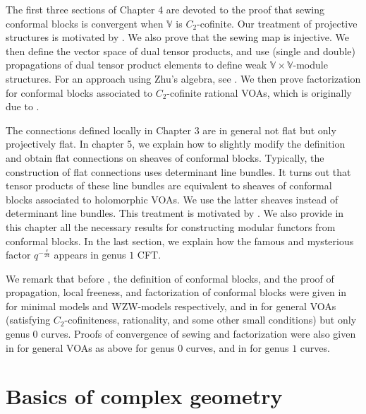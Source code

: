 \documentclass[12pt,a4paper,notitlepage]{report}
\theoremstyle{definition}
\theoremstyle{plain}
\newcommand{\Vbb}{\mathbb V}
\numberwithin{equation}{section}
\begin{document}
The first three sections of Chapter 4 are devoted to the proof that sewing conformal blocks is convergent when $\Vbb$ is $C_2$-cofinite. Our treatment of projective structures is motivated by \cite[Sec. 8.2]{FB04}. We also prove that the sewing map is injective. We then define the vector space of dual tensor products, and use (single and double) propagations of dual tensor product elements to define weak $\Vbb\times\Vbb$-module structures.  For an approach using Zhu's algebra, see \cite{DGT19b}. We then prove factorization for conformal blocks associated to $C_2$-cofinite rational VOAs, which is originally due to \cite{DGT19b}.

The connections defined locally in Chapter 3 are in general not flat but only projectively flat. In chapter 5, we explain how to slightly modify the definition and obtain flat connections on sheaves of conformal blocks. Typically, the construction of flat connections uses determinant line bundles. It turns out that tensor products of these line bundles are equivalent to sheaves of conformal blocks associated to holomorphic VOAs. We use the latter sheaves instead of determinant line bundles. This treatment is motivated by \cite{AU07a,AU07b}. We also provide in this chapter all the necessary results for constructing modular functors from conformal blocks. In the last section, we explain how the famous and mysterious factor $q^{-\frac c{24}}$ appears in genus $1$ CFT.

We remark that before \cite{FB04,DGT19a,DGT19b}, the definition of conformal blocks, and the proof of propagation, local freeness, and factorization of conformal blocks were given in \cite{BFM91,TUY89} for minimal models and WZW-models respectively, and in \cite{NT05} for general VOAs (satisfying $C_2$-cofiniteness, rationality, and some other small conditions) but only genus $0$ curves. Proofs of convergence of sewing and factorization were also given in \cite{Hua95,Hua98,Hua05a} for general VOAs as above for genus $0$ curves, and in \cite{Zhu96,Hua05b} for genus $1$ curves.








\chapter{Basics of complex geometry}
\end{document}
